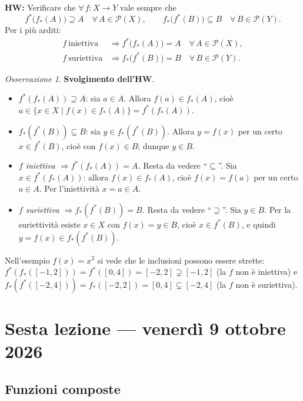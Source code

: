 \documentclass[11pt,a4paper]{article}
\newcommand{\Pot}{\mathcal{P}}
\theoremstyle{definition}
\theoremstyle{plain}
\theoremstyle{remark}
\newtheorem*{osservazione}{Osservazione}
\begin{document}
\textbf{HW:} Verificare che $\forall\,f\colon X\to Y$ vale sempre che
\[
f^*\bigl(f_*(A)\bigr)\supseteq A\quad\forall\,A\in\Pot(X),\qquad
f_*\bigl(f^*(B)\bigr)\subseteq B\quad\forall\,B\in\Pot(Y).
\]
Per i pi\`u arditi:
\begin{align*}
f\ \text{iniettiva}&\Longrightarrow f^*\bigl(f_*(A)\bigr)=A\quad\forall\,A\in\Pot(X),\\
f\ \text{suriettiva}&\Longrightarrow f_*\bigl(f^*(B)\bigr)=B\quad\forall\,B\in\Pot(Y).
\end{align*}

\begin{osservazione}
\textbf{Svolgimento dell'HW}. 
\begin{itemize}
\item $f^*(f_*(A))\supseteq A$: sia $a\in A$. Allora $f(a)\in f_*(A)$, cio\`e $a\in\{x\in X\mid f(x)\in f_*(A)\}=f^*(f_*(A))$.
\item $f_*(f^*(B))\subseteq B$: sia $y\in f_*(f^*(B))$. Allora $y=f(x)$ per un certo $x\in f^*(B)$, cio\`e con $f(x)\in B$; dunque $y\in B$.
\item \emph{$f$ iniettiva $\Rightarrow f^*(f_*(A))=A$.} Resta da vedere ``$\subseteq$''. Sia $x\in f^*(f_*(A))$: allora $f(x)\in f_*(A)$, cio\`e $f(x)=f(a)$ per un certo $a\in A$. Per l'iniettivit\`a $x=a\in A$.
\item \emph{$f$ suriettiva $\Rightarrow f_*(f^*(B))=B$.} Resta da vedere ``$\supseteq$''. Sia $y\in B$. Per la suriettivit\`a esiste $x\in X$ con $f(x)=y\in B$, cio\`e $x\in f^*(B)$, e quindi $y=f(x)\in f_*(f^*(B))$.
\end{itemize}
Nell'esempio $f(x)=x^2$ si vede che le inclusioni possono essere strette: $f^*(f_*([-1,2]))=f^*([0,4])=[-2,2]\supsetneq[-1,2]$ (la $f$ non \`e iniettiva) e $f_*(f^*([-2,4]))=f_*([-2,2])=[0,4]\subsetneq[-2,4]$ (la $f$ non \`e suriettiva).
\end{osservazione}

\section{Sesta lezione --- venerd\`i 9 ottobre 2026}

\subsection{Funzioni composte}
\end{document}

